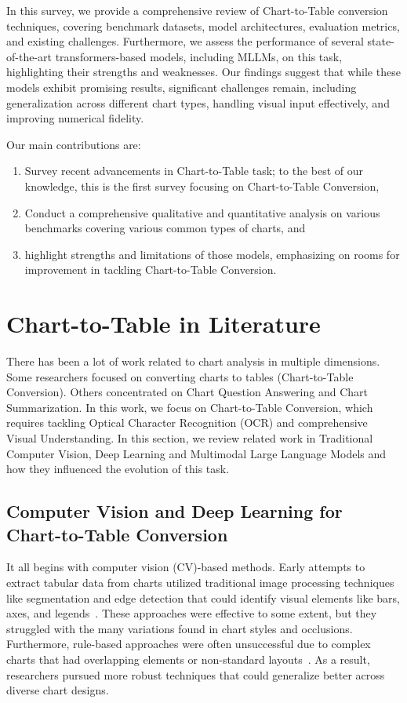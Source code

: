 \documentclass[
	letterpaper, %
]{jdf}
\begin{document}
In this survey, we provide a comprehensive review of Chart-to-Table conversion techniques, covering benchmark datasets, model architectures, evaluation metrics, and existing challenges.
Furthermore, we assess the performance of several state-of-the-art transformers-based models, including MLLMs, on this task, highlighting their strengths and weaknesses.
Our findings suggest that while these models exhibit promising results, significant challenges remain, including generalization across different chart types, handling visual input effectively, and improving numerical fidelity.

Our main contributions are:
\begin{enumerate}
     \item Survey recent advancements in Chart-to-Table task; to the best of our knowledge, this is the first survey focusing on Chart-to-Table Conversion,
     \item Conduct a comprehensive qualitative and quantitative analysis on various benchmarks covering various common types of charts, and
     \item highlight strengths and limitations  of those models, emphasizing on rooms for improvement in tackling Chart-to-Table Conversion.
       \end{enumerate}

\section{Chart-to-Table in Literature}\label{sect:literature}
There has been a lot of work related to chart analysis in multiple dimensions.
Some researchers focused on converting charts to tables (Chart-to-Table Conversion).
Others concentrated on Chart Question Answering and Chart Summarization.
In this work, we focus on Chart-to-Table Conversion, which requires tackling Optical Character Recognition (OCR) and comprehensive Visual Understanding.
In this section, we review related work in Traditional Computer Vision, Deep Learning and Multimodal Large Language Models and how they influenced the evolution of this task.


\subsection{Computer Vision and Deep Learning for Chart-to-Table Conversion}\label{ssect:cv-and-dl}
    It all begins with computer vision (CV)-based methods.
    Early attempts to extract tabular data from charts utilized traditional image processing techniques like segmentation and edge detection that could identify visual elements like bars, axes, and legends~\cite{sreevalsan2021tensor}.
    These approaches were effective to some extent, but they struggled with the many variations found in chart styles and occlusions.
    Furthermore, rule-based approaches were often unsuccessful due to complex charts that had overlapping elements or non-standard layouts~\cite{poco2017reverse}.
    As a result, researchers pursued more robust techniques that could generalize better across diverse chart designs.
\end{document}
